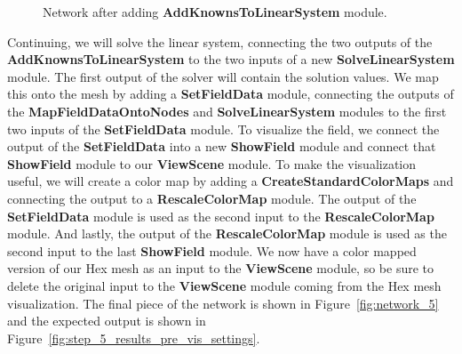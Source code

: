 \documentclass[fleqn,11pt,openany]{book}
\begin{document}
\begin{figure}
\caption{Network after adding {\bf AddKnownsToLinearSystem}
module.}\label{fig:network_4_map_field_data}
\end{figure}

Continuing, we will solve the linear system, connecting the two
outputs of the {\bf AddKnownsToLinearSystem} to the two inputs of a
new {\bf SolveLinearSystem} module. The first output of the solver
will contain the solution values. We map this onto the mesh by adding
a {\bf SetFieldData} module, connecting the outputs of the {\bf
MapFieldDataOntoNodes} and {\bf SolveLinearSystem} modules to the
first two inputs of the {\bf SetFieldData} module. To visualize the
field, we connect the output of the {\bf SetFieldData} into a new {\bf
ShowField} module and connect that {\bf ShowField} module to our {\bf
ViewScene} module. To make the visualization useful, we will create a
color map by adding a {\bf CreateStandardColorMaps} and connecting the
output to a {\bf RescaleColorMap} module. The output of the {\bf
SetFieldData} module is used as the second input to the {\bf
RescaleColorMap} module. And lastly, the output of the {\bf
RescaleColorMap} module is used as the second input to the last {\bf
ShowField} module. We now have a color mapped version of our Hex mesh
as an input to the {\bf ViewScene} module, so be sure to delete the
original input to the {\bf ViewScene} module coming from the Hex mesh
visualization. The final piece of the network is shown in
Figure~\ref{fig:network_5} and the expected output is shown in
Figure~\ref{fig:step_5_results_pre_vis_settings}.
\end{document}
